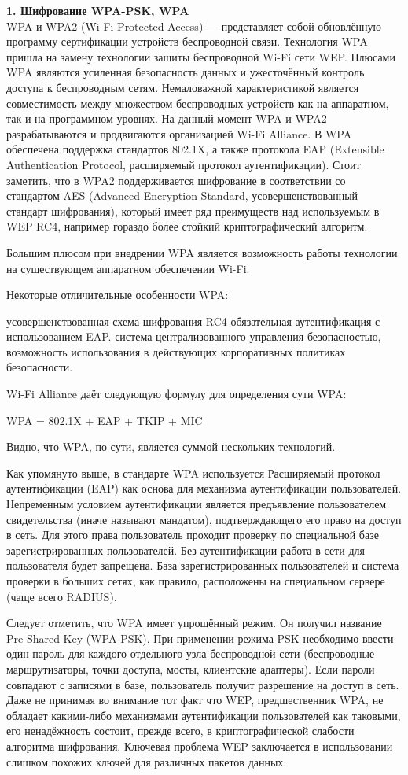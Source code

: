 \documentclass[12pt]{article}
\begin{document}
\pagestyle{empty}
{\bf 1. Шифрование WPA-PSK, WPA}\\
WPA и WPA2 (Wi-Fi Protected Access) — представляет собой обновлённую программу сертификации устройств беспроводной связи. Технология WPA пришла на замену технологии защиты беспроводной Wi-Fi сети WEP. Плюсами WPA являются усиленная безопасность данных и ужесточённый контроль доступа к беспроводным сетям. Немаловажной характеристикой является совместимость между множеством беспроводных устройств как на аппаратном, так и на программном уровнях. На данный момент WPA и WPA2 разрабатываются и продвигаются организацией Wi-Fi Alliance. 
В WPA обеспечена поддержка стандартов 802.1X, а также протокола EAP (Extensible Authentication Protocol, расширяемый протокол аутентификации). Стоит заметить, что в WPA2 поддерживается шифрование в соответствии со стандартом AES (Advanced Encryption Standard, усовершенствованный стандарт шифрования), который имеет ряд преимуществ над используемым в WEP RC4, например гораздо более стойкий криптографический алгоритм.

Большим плюсом при внедрении WPA является возможность работы технологии на существующем аппаратном обеспечении Wi-Fi.

Некоторые отличительные особенности WPA:

    усовершенствованная схема шифрования RC4
    обязательная аутентификация с использованием EAP.
    система централизованного управления безопасностью, возможность использования в действующих корпоративных политиках безопасности.

Wi-Fi Alliance даёт следующую формулу для определения сути WPA:

WPA = 802.1X + EAP + TKIP + MIC

Видно, что WPA, по сути, является суммой нескольких технологий.

Как упомянуто выше, в стандарте WPA используется Расширяемый протокол аутентификации (EAP) как основа для механизма аутентификации пользователей. Непременным условием аутентификации является предъявление пользователем свидетельства (иначе называют мандатом), подтверждающего его право на доступ в сеть. Для этого права пользователь проходит проверку по специальной базе зарегистрированных пользователей. Без аутентификации работа в сети для пользователя будет запрещена. База зарегистрированных пользователей и система проверки в больших сетях, как правило, расположены на специальном сервере (чаще всего RADIUS).

Следует отметить, что WPA имеет упрощённый режим. Он получил название Pre-Shared Key (WPA-PSK). При применении режима PSK необходимо ввести один пароль для каждого отдельного узла беспроводной сети (беспроводные маршрутизаторы, точки доступа, мосты, клиентские адаптеры). Если пароли совпадают с записями в базе, пользователь получит разрешение на доступ в сеть. 
Даже не принимая во внимание тот факт что WEP, предшественник WPA, не обладает какими-либо механизмами аутентификации пользователей как таковыми, его ненадёжность состоит, прежде всего, в криптографической слабости алгоритма шифрования. Ключевая проблема WEP заключается в использовании слишком похожих ключей для различных пакетов данных.
\end{document}
